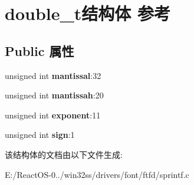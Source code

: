 \hypertarget{structdouble__t}{}\section{double\+\_\+t结构体 参考}
\label{structdouble__t}
\subsection*{Public 属性}
\begin{DoxyCompactItemize}
\item 
\mbox{\label{structdouble__t_accbc24dcfbb1bd6239b0a451ce8a458d}} 
unsigned int {\bfseries mantissal}\+:32
\item 
\mbox{\label{structdouble__t_ac798faef6b1e6b397f996efd7ae6efc5}} 
unsigned int {\bfseries mantissah}\+:20
\item 
\mbox{\label{structdouble__t_a3b4fab0557a7440d68e036147bcc2512}} 
unsigned int {\bfseries exponent}\+:11
\item 
\mbox{\label{structdouble__t_a91136249107889c240664707dc354923}} 
unsigned int {\bfseries sign}\+:1
\end{DoxyCompactItemize}


该结构体的文档由以下文件生成\+:\begin{DoxyCompactItemize}
\item 
E\+:/\+React\+O\+S-\/0../win32ss/drivers/font/ftfd/sprintf.\+c\end{DoxyCompactItemize}
